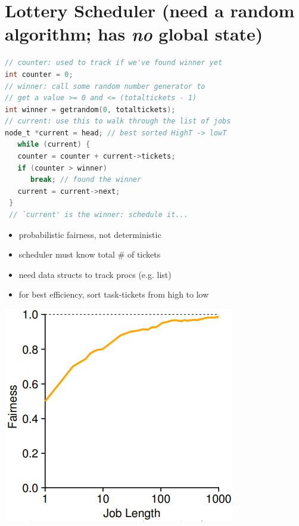 \section*{Lottery Scheduler (need a random algorithm; has \emph{no} global state)}
\begin{minipage}{.75\linewidth}
\begin{lstlisting}[language=c]
// counter: used to track if we've found winner yet
int counter = 0;
// winner: call some random number generator to
// get a value >= 0 and <= (totaltickets - 1)
int winner = getrandom(0, totaltickets);
// current: use this to walk through the list of jobs
node_t *current = head; // best sorted HighT -> lowT
   while (current) {
   counter = counter + current->tickets;
   if (counter > winner)
      break; // found the winner
   current = current->next;
 }
 // `current' is the winner: schedule it...
\end{lstlisting}
\end{minipage}
\begin{minipage}{.25\linewidth}
  \flushleft
  \begin{itemize}
  \item probabilistic fairness, not deterministic
  \item scheduler must know total \# of tickets
  \item need data structs to track procs (e.g. list)
  \item for best efficiency, sort task-tickets from high to low
  \end{itemize}
\end{minipage}
\begin{minipage}{.45\linewidth}
  \includegraphics[width=\linewidth]{imgs/sched_lot_fair}
\end{minipage}
